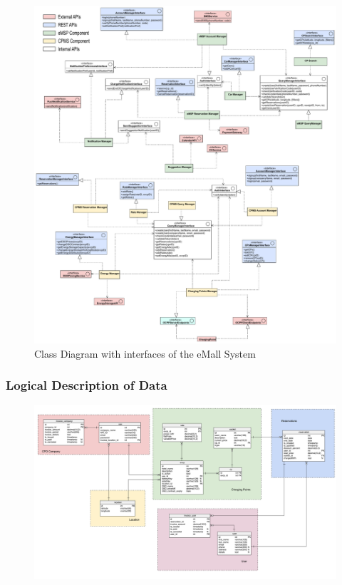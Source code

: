 \begin{figure}[H]
    \centering
    \hspace*{-2.5cm}
    \includegraphics[height=\textheight-1.5cm,keepaspectratio]{src/componentInterfaces/component_interface.pdf}
    \caption{Class Diagram with interfaces of the eMall System}
\end{figure}


\subsubsection{Logical Description of Data}
\begin{figure}[H]
    \includegraphics[scale=0.30]{src/ERDiagram/er_diagram.pdf}
\end{figure}

